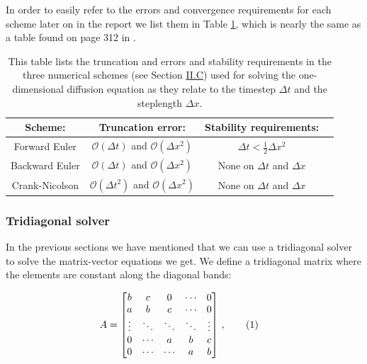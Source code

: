 \documentclass[reprint,english,notitlepage]{revtex4-1}  %
\newcommand\numberthis{\addtocounter{equation}{1}\tag{\theequation}}
\begin{document}
In order to easily refer to the errors and convergence requirements for each scheme later on in the report we list them in Table \ref{table:schemes_conv_and_err_1D}, which is nearly the same as a table found on page 312 in \citep{Hjorth-Jensen2015}.

\begin{table}[H]
\centering
\caption{This table lists the truncation and errors and stability requirements in the three numerical schemes (see Section \hyperref[sec:formalism_numerical_1D]{II.C}) used for solving the one-dimensional diffusion equation as they relate to the timestep $\Delta t$ and the steplength $\Delta x$.} \label{table:schemes_conv_and_err_1D}
\begin{tabular}{|c|c|c|c|}
\hline
Scheme: & Truncation error: & Stability requirements: \\
\hline
Forward Euler & $\mathcal{O}(\Delta t)$ and $\mathcal{O}(\Delta x^2)$ & $\Delta t < \frac{1}{2} \Delta x^2$ \\
\hline
Backward Euler & $\mathcal{O}(\Delta t)$ and $\mathcal{O}(\Delta x^2)$ & None on $\Delta t$ and $\Delta x$ \\\hline
Crank-Nicolson & $\mathcal{O}(\Delta t^2)$ and $\mathcal{O}(\Delta x^2)$ & None on $\Delta t$ and $\Delta x$ \\
\hline
\end{tabular}
\end{table}


\subsubsection{Tridiagonal solver} \label{sec:formalism_tridiagonal_solver}

In the previous sections we have mentioned that we can use a tridiagonal solver to solve the matrix-vector equations we get. We define a tridiagonal matrix where the elements are constant along the diagonal bands:

\begin{align*}
A &= \begin{bmatrix}
b & c & 0  & \cdots & 0 \\
a & b & c &   \cdots & 0 \\
\vdots & \ddots & \ddots & \ddots & \vdots \\
0 & \cdots  & a & b & c \\
0 & \cdots & \cdots  & a & b \\
\end{bmatrix} \, , \numberthis \label{eq:tridiag_matrix}
\end{align*}
\end{document}
